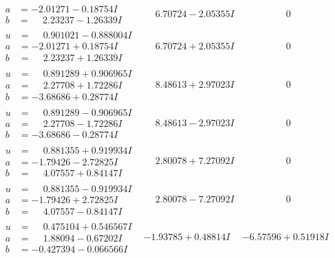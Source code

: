 \documentclass[1p]{elsarticle_modified}
\theoremstyle{definition}
\begin{document}
$$\begin{array}{c|c|c}
\begin{aligned}
a &= -2.01271 - 0.18754 I \\
b &= \phantom{-}2.23237 - 1.26339 I\end{aligned}
 & \phantom{-}6.70724 - 2.05355 I & \phantom{-0.000000 } 0 \\ \hline\begin{aligned}
u &= \phantom{-}0.901021 - 0.888004 I \\
a &= -2.01271 + 0.18754 I \\
b &= \phantom{-}2.23237 + 1.26339 I\end{aligned}
 & \phantom{-}6.70724 + 2.05355 I & \phantom{-0.000000 } 0 \\ \hline\begin{aligned}
u &= \phantom{-}0.891289 + 0.906965 I \\
a &= \phantom{-}2.27708 + 1.72286 I \\
b &= -3.68686 + 0.28774 I\end{aligned}
 & \phantom{-}8.48613 + 2.97023 I & \phantom{-0.000000 } 0 \\ \hline\begin{aligned}
u &= \phantom{-}0.891289 - 0.906965 I \\
a &= \phantom{-}2.27708 - 1.72286 I \\
b &= -3.68686 - 0.28774 I\end{aligned}
 & \phantom{-}8.48613 - 2.97023 I & \phantom{-0.000000 } 0 \\ \hline\begin{aligned}
u &= \phantom{-}0.881355 + 0.919934 I \\
a &= -1.79426 - 2.72825 I \\
b &= \phantom{-}4.07557 + 0.84147 I\end{aligned}
 & \phantom{-}2.80078 + 7.27092 I & \phantom{-0.000000 } 0 \\ \hline\begin{aligned}
u &= \phantom{-}0.881355 - 0.919934 I \\
a &= -1.79426 + 2.72825 I \\
b &= \phantom{-}4.07557 - 0.84147 I\end{aligned}
 & \phantom{-}2.80078 - 7.27092 I & \phantom{-0.000000 } 0 \\ \hline\begin{aligned}
u &= \phantom{-}0.475104 + 0.546567 I \\
a &= \phantom{-}1.88094 - 0.67202 I \\
b &= -0.427394 - 0.066566 I\end{aligned}
 & -1.93785 + 0.48814 I & -6.57596 + 0.51918 I \\ \hline\begin{aligned}

\end{aligned}
\end{array}$$
\end{document}
